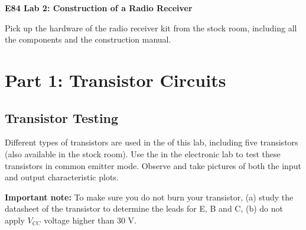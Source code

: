 \usepackage{html}


{\Large \bf E84 Lab 2: Construction of a Radio Receiver}


Pick up the hardware of the radio receiver kit from the stock room,
including all the components and the construction manual.

\section{Part 1: Transistor Circuits}

\subsection{Transistor Testing}

Different types of transistors are used in the 
of this lab, including five
transistors (also available in the stock room). Use the 
in the electronic lab to test these transistors in common emitter mode. 
Observe and take pictures of both the input and output characteristic plots. 


{\bf Important note:} To make sure you do not burn your transistor, 
(a) study the datasheet of the transistor to determine the leads for E, B and C,
(b) do not apply $V_{CC}$ voltage higher than 30 V.


